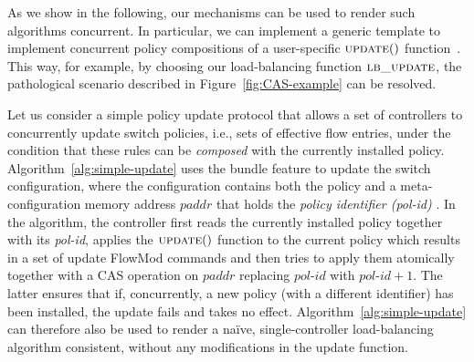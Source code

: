 \documentclass[conference]{sigcomm-alternate}
\newcommand{\paddr}{\textit{paddr}\xspace}
\newcommand{\pid}{\textit{pol-id}\xspace}
\newcommand{\ufunc}{update} %
\newcommand{\liron}[1]{\textit{\textcolor{mypurple}{[liron]: #1}}} %
\newcommand{\petr}[1]{\textit{\textcolor{blue}{[petr]: #1}}} %
\newcommand{\execatomic}{\textbf{execute-transaction}}
\begin{document}
As we show in the following, our mechanisms can be used 
to render such algorithms concurrent.
In particular, we can implement a
generic template to
implement concurrent policy compositions of a user-specific
$\textsc{\ufunc}()$ function~\cite{stn}.
This way, for example, by choosing our load-balancing
function $\textsc{lb\_update}$, 
the pathological scenario described in 
Figure~\ref{fig:CAS-example} can be resolved.

Let us consider a simple policy update protocol that
allows a set of  controllers to concurrently update switch policies, i.e., sets of
effective flow entries, under the
condition that these rules can be \emph{composed} with the currently installed
policy.
Algorithm~\ref{alg:simple-update} uses the bundle feature to update
the switch configuration, where the configuration contains both the
policy and a meta-configuration memory address $\paddr$ that holds the \emph{policy identifier (\pid)} .
In the algorithm, the controller first reads the currently installed
policy together with its {\pid},  applies the
$\textsc{\ufunc}()$ function to the current policy which results in a
set of update FlowMod commands and then tries to apply them
atomically together with a CAS operation on $\paddr$ replacing $\pid$
with $\pid+1$.
The latter ensures that if, concurrently, a new policy (with a different identifier) has been installed, the update
fails and takes no effect.
Algorithm~\ref{alg:simple-update} can therefore also be used
to render a na\"ive, single-controller load-balancing algorithm
consistent, without any modifications in the update function.



\end{document}
